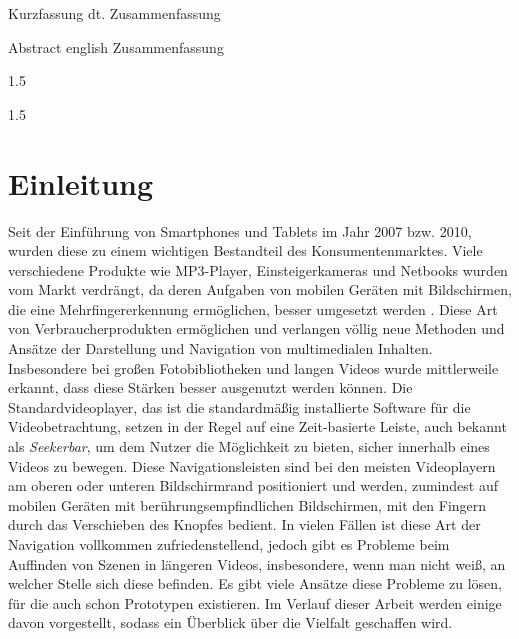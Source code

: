 \documentclass[11pt,a4paper]{report}
\begin{document}
\setcounter{page}{5}
\begin{preface}{Kurzfassung}
 dt. Zusammenfassung
\end{preface}

\setcounter{page}{6}
\begin{preface}{Abstract}
 english Zusammenfassung
\end{preface}



\setcounter{page}{7}
{
	\setlength{\baselineskip}%
			{1.5\baselineskip}
	\afterpreface
}

{
	\setlength{\baselineskip}%
			{1.5\baselineskip}
	\listoffigures
	\clearemptydoublepage
	\clearemptydoublepage
}



\chapter{Einleitung}

Seit der Einführung von Smartphones und Tablets im Jahr 2007 bzw. 2010, wurden diese zu einem wichtigen Bestandteil des Konsumentenmarktes. Viele verschiedene Produkte wie MP3-Player, Einsteigerkameras und Netbooks wurden vom Markt verdrängt, da deren Aufgaben von mobilen Geräten mit Bildschirmen, die eine Mehrfingererkennung ermöglichen, besser umgesetzt werden \cite{schoeffmann2014stack}. Diese Art von Verbraucherprodukten ermöglichen und verlangen völlig neue Methoden und Ansätze der Darstellung und Navigation von multimedialen Inhalten. Insbesondere bei großen Fotobibliotheken und langen Videos wurde mittlerweile erkannt, dass diese Stärken besser ausgenutzt werden können. Die Standardvideoplayer, das ist die standardmäßig installierte Software für die Videobetrachtung, setzen in der Regel auf eine Zeit-basierte Leiste, auch bekannt als \textit{Seekerbar}, um dem Nutzer die Möglichkeit zu bieten, sicher innerhalb eines Videos zu bewegen. Diese Navigationsleisten sind bei den meisten Videoplayern am oberen oder unteren Bildschirmrand positioniert und werden, zumindest auf mobilen Geräten mit berührungsempfindlichen Bildschirmen, mit den Fingern durch das Verschieben des Knopfes bedient. In vielen Fällen ist diese Art der Navigation vollkommen zufriedenstellend, jedoch gibt es Probleme beim Auffinden von Szenen in längeren Videos, insbesondere, wenn man nicht weiß, an welcher Stelle sich diese befinden. Es gibt viele Ansätze diese Probleme zu lösen, für die auch schon Prototypen existieren. Im Verlauf dieser Arbeit werden einige davon vorgestellt, sodass ein Überblick über die Vielfalt geschaffen wird. \cite{furht2009handbook}
\end{document}
